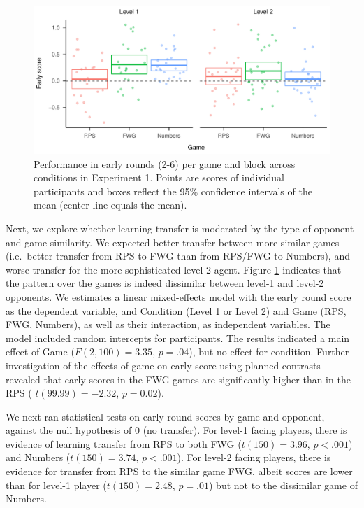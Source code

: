\documentclass[smallextended]{svjour3}       %
\begin{document}
\begin{figure}

{\centering \includegraphics[width=\textwidth]{CBB_files/figure-latex/exp1-early-score-by-opp-1} 

}

\caption{\label{ref:figure4-caption}Performance in early rounds (2-6) per game and block across conditions in Experiment 1. Points are scores of individual participants and boxes reflect the 95\% confidence intervals of the mean (center line equals the mean).}\label{fig:exp1-early-score-by-opp}
\end{figure}

Next, we explore whether learning transfer is moderated by the type of
opponent and game similarity. We expected better transfer between more
similar games (i.e.~better transfer from RPS to FWG than from RPS/FWG to
Numbers), and worse transfer for the more sophisticated level-2 agent.
Figure \ref{fig:exp1-early-score-by-opp} indicates that the pattern over
the games is indeed dissimilar between level-1 and level-2 opponents. We
estimates a linear mixed-effects model with the early round score as the
dependent variable, and Condition (Level 1 or Level 2) and Game (RPS,
FWG, Numbers), as well as their interaction, as independent variables.
The model included random intercepts for participants. The results
indicated a main effect of Game (\(F(2,100) = 3.35\), \(p = .04\)), but
no effect for condition. Further investigation of the effects of game on
early score using planned contrasts revealed that early scores in the
FWG games are significantly higher than in the RPS (
\(t(99.99) = -2.32\), \(p = 0.02\)).

We next ran statistical tests on early round scores by game and
opponent, against the null hypothesis of 0 (no transfer). For level-1
facing players, there is evidence of learning transfer from RPS to both
FWG (\(t(150) = 3.96\), \(p < .001\)) and Numbers (\(t(150) = 3.74\),
\(p < .001\)). For level-2 facing players, there is evidence for
transfer from RPS to the similar game FWG, albeit scores are lower than
for level-1 player (\(t(150) = 2.48\), \(p = .01\)) but not to the
dissimilar game of Numbers.
\end{document}
